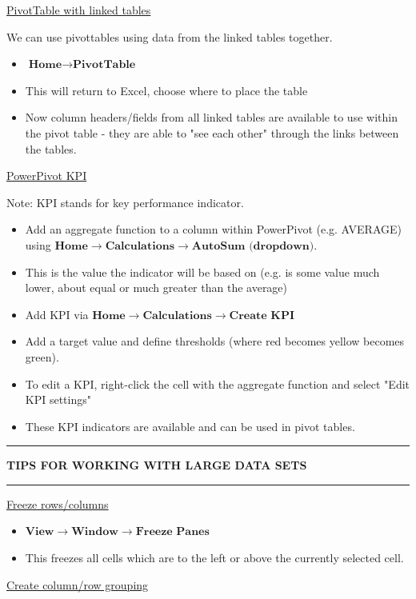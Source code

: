 \documentclass[8pt]{extarticle}
\newcommand{\heading}[1]{%
    \noindent
    \rule{\linewidth}{0.4pt}
    \begin{center}
        \vspace{-1ex}
        \textbf{#1}        
        \vspace{-2.5ex}
    \end{center}
    \rule{\linewidth}{0.4pt}
}
\begin{document}
\begin{multicols}{3}
\begin{center}
    \underline{PivotTable with linked tables}
\end{center}

We can use pivottables using data from the linked tables together.

\begin{itemize}
    \item $\textbf{Home} \rightarrow \textbf{PivotTable}$
    \item This will return to Excel, choose where to place the table
    \item Now column headers/fields from all linked tables are available to use within the pivot table - they are able to "see each other" through the links between the tables.
\end{itemize}

\begin{center}
    \underline{PowerPivot KPI}
\end{center}

Note: KPI stands for key performance indicator.

\begin{itemize}
    \item Add an aggregate function to a column within PowerPivot (e.g. AVERAGE) using $\textbf{Home} \rightarrow \textbf{Calculations} \rightarrow \textbf{AutoSum (dropdown)}$.
    \item This is the value the indicator will be based on (e.g. is some value much lower, about equal or much greater than the average)
    \item Add KPI via $\textbf{Home} \rightarrow \textbf{Calculations} \rightarrow \textbf{Create KPI}$
    \item Add a target value and define thresholds (where red becomes yellow becomes green).
    \item To edit a KPI, right-click the cell with the aggregate function and select "Edit KPI settings"
    \item These KPI indicators are available and can be used in pivot tables.
\end{itemize}

\heading{TIPS FOR WORKING WITH LARGE DATA SETS}

\begin{center}
    \underline{Freeze rows/columns}
\end{center}

\begin{itemize}
    \item $\textbf{View} \rightarrow \textbf{Window} \rightarrow \textbf{Freeze Panes}$
    \item This freezes all cells which are to the left or above the currently selected cell.
\end{itemize}
\columnbreak
\begin{center}
    \underline{Create column/row grouping}
\end{center}


\end{multicols}
\end{document}
